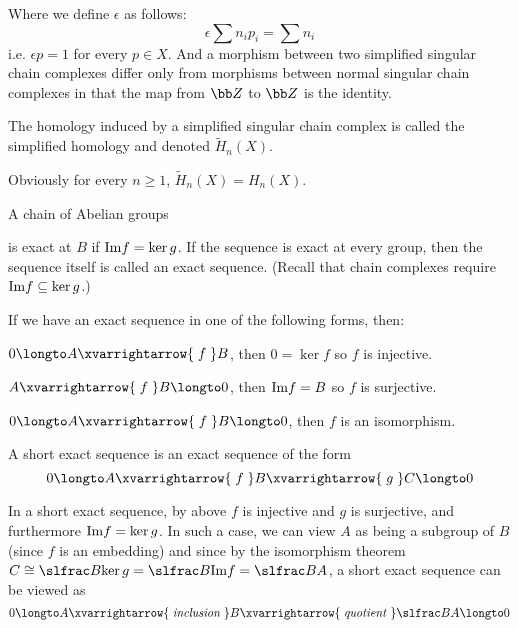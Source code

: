     Where we define $\epsilon$ as follows:
    $$ \epsilon\sum n_ip_i = \sum n_i $$
    i.e. $\epsilon p=1$ for every $p\in X$.
    And a morphism between two simplified singular chain complexes differ only from morphisms between normal singular chain complexes in that the map from ${\bb Z}$ to ${\bb Z}$ is the identity.

    The homology induced by a simplified singular chain complex is called the {\emphcolor simplified homology} and denoted $\tilde H_n(X)$.

\edefn

Obviously for every $n\geq1$, $\tilde H_n(X)=H_n(X)$.

\bdefn

    A chain of Abelian groups

    \bigskip
    \centerline{}
    \bigskip

    is {\emphcolor exact} at $B$ if ${\rm Im}f=\ker g$.
    If the sequence is exact at every group, then the sequence itself is called an {\emphcolor exact sequence}.
    (Recall that chain complexes require ${\rm Im}f\subseteq\ker g$.)

\edefn

If we have an exact sequence in one of the following forms, then:

\benum
    \item $0\longto A\xvarrightarrow{\;f\;}B$, then $0=\ker f$ so $f$ is injective.
    \item $A\xvarrightarrow{\;f\;}B\longto0$, then ${\rm Im}f=B$ so $f$ is surjective.
    \item $0\longto A\xvarrightarrow{\;f\;}B\longto0$, then $f$ is an isomorphism.
\eenum

\bdefn

    A {\emphcolor short exact sequence} is an exact sequence of the form
    $$ 0\longto A\xvarrightarrow{\;f\;}B\xvarrightarrow{\;g\;}C\longto0 $$

\edefn

In a short exact sequence, by above $f$ is injective and $g$ is surjective, and furthermore ${\rm Im}f=\ker g$.
In such a case, we can view $A$ as being a subgroup of $B$ (since $f$ is an embedding) and since by the isomorphism theorem $C\cong\slfrac B{\ker g}=\slfrac B{{\rm Im}f}=\slfrac BA$, a short exact sequence
can be viewed as
$$ 0 \longto A\xvarrightarrow{\;{\it inclusion}\;}B\xvarrightarrow{\;{\it quotient}\;}\slfrac BA\longto0 $$

